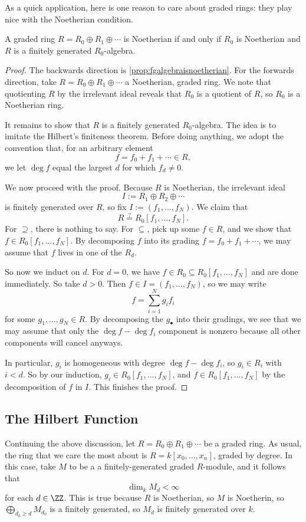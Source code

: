 As a quick application, here is one reason to care about graded rings: they play nice with the Noetherian condition.
\begin{proposition}
	A graded ring $R=R_0\oplus R_1\oplus\cdots$ is Noetherian if and only if $R_0$ is Noetherian and $R$ is a finitely generated $R_0$-algebra.
\end{proposition}
\begin{proof}
	The backwards direction is \autoref{prop:fgalgebraisnoetherian}. For the forwards direction, take $R=R_0\oplus R_1\oplus\cdots$ a Noetherian, graded ring. We note that quotienting $R$ by the irrelevant ideal reveals that $R_0$ is a quotient of $R$, so $R_0$ is a Noetherian ring.

	It remains to show that $R$ is a finitely generated $R_0$-algebra. The idea is to imitate the Hilbert's finiteness theorem. Before doing anything, we adopt the convention that, for an arbitrary element
	\[f=f_0+f_1+\cdots\in R,\]
	we let $\deg f$ equal the largest $d$ for which $f_d\ne0$.
	
	We now proceed with the proof. Because $R$ is Noetherian, the irrelevant ideal
	\[I:=R_1\oplus R_2\oplus\cdots\]
	is finitely generated over $R$, so fix $I:=(f_1,\ldots,f_N)$. We claim that
	\[R\stackrel?=R_0[f_1,\ldots,f_N].\]
	For $\supseteq$, there is nothing to say. For $\subseteq$, pick up some $f\in R$, and we show that $f\in R_0[f_1,\ldots,f_N]$. By decomposing $f$ into its grading $f=f_0+f_1+\cdots$, we may assume that $f$ lives in one of the $R_d$.

	So now we induct on $d$. For $d=0$, we have $f\in R_0\subseteq R_0[f_1,\ldots,f_N]$ and are done immediately. So take $d>0$. Then $f\in I=(f_1,\ldots,f_N)$, so we may write
	\[f=\sum_{i=1}^Ng_if_i\]
	for some $g_1,\ldots,g_N\in R$. By decomposing the $g_\bullet$ into their gradings, we see that we may assume that only the $\deg f-\deg f_i$ component is nonzero because all other components will cancel anyways.
	
	In particular, $g_i$ is homogeneous with degree $\deg f-\deg f_i$, so $g_i\in R_i$ with $i<d$. So by our induction, $g_i\in R_0[f_1,\ldots,f_N]$, and $f\in R_0[f_1,\ldots,f_N]$ by the decomposition of $f$ in $I$. This finishes the proof.
\end{proof}

\subsection{The Hilbert Function}
Continuing the above discussion, let $R=R_0\oplus R_1\oplus\cdots$ be a graded ring. 
As usual, the ring that we care the most about is $R=k[x_0,\ldots,x_n]$, graded by degree. In this case, take $M$ to be a a finitely-generated graded $R$-module, and it follows that
\[\dim_kM_d<\infty\]
for each $d\in\ZZ$. This is true because $R$ is Noetherian, so $M$ is Noetherin, so $\bigoplus_{d_0\ge d}M_{d_0}$ is a finitely generated, so $M_d$ is finitely generated over $k$.

